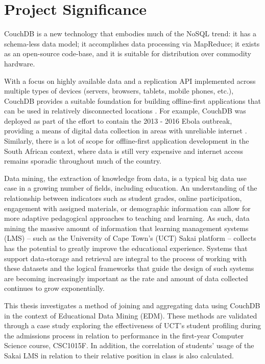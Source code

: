 \section{Project Significance}
CouchDB is a new technology that embodies much of the NoSQL trend: it has a schema-less data model; it accomplishes data processing via MapReduce; it exists as an open-source code-base, and it is suitable for distribution over commodity hardware.

With a focus on highly available data and a replication API implemented across multiple types of devices (servers, browsers, tablets, mobile phones, etc.), CouchDB provides a suitable foundation for building offline-first applications that can be used in relatively disconnected locations \cite{ebola2017}. For example, CouchDB was deployed as part of the effort to contain the 2013 - 2016 Ebola outbreak, providing a means of digital data collection in areas with unreliable internet \cite{ebola2017}. Similarly, there is a lot of scope for offline-first application development in the South African context, where data is still very expensive and internet access remains sporadic throughout much of the country.

Data mining, the extraction of knowledge from data, is a typical big data use case in a growing number of fields, including education. An understanding of the relationship between indicators such as student grades, online participation, engagement with assigned materials, or demographic information can allow for more adaptive pedagogical approaches to teaching and learning. As such, data mining the massive amount of information that learning management systems (LMS) – such as the University of Cape Town's (UCT) Sakai platform \cite{sakai} – collects has the potential to greatly improve the educational experience. Systems that support data-storage and retrieval are integral to the process of working with these datasets and the logical frameworks that guide the design of such systems are becoming increasingly important as the rate and amount of data collected continues to grow exponentially.

This thesis investigates a method of joining and aggregating data using CouchDB in the context of Educational Data Mining (EDM). These methods are validated through a case study exploring the effectiveness of UCT's student profiling during the admissions process in relation to performance in the first-year Computer Science course, CSC1015F. In addition, the correlation of students' usage of the Sakai LMS in relation to their relative position in class is also calculated.

